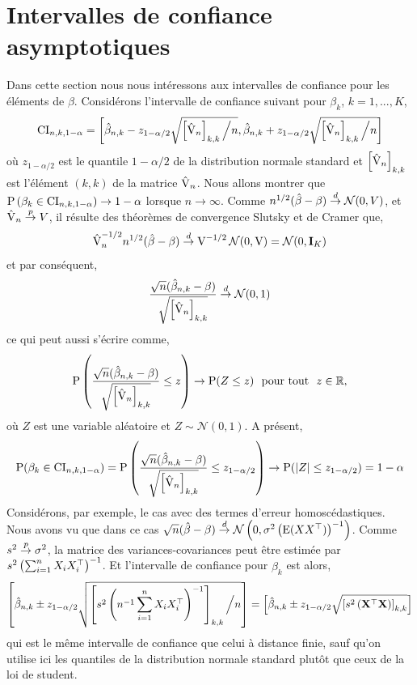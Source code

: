 \section{Intervalles de confiance asymptotiques}
Dans cette section nous nous intéressons aux intervalles de confiance pour les éléments de $\beta$. Considérons l'intervalle de confiance suivant pour $\beta_k$, $k=1,...,K$,
\begin{align*}
\mathrm{CI}_{n, k, 1-\alpha} = \left[\hat{\beta}_{n, k} - z_{1-\alpha/2}\sqrt{\left[\hat{\operatorname{V}}_n\right]_{k,k} \Big{/} n}, 
\hat{\beta}_{n, k} + z_{1-\alpha/2}\sqrt{\left[\hat{\operatorname{V}}_n\right]_{k,k} \Big{/} n}\right]
\end{align*}
où $ z_{1-\alpha/2}$ est le quantile $1-\alpha/2$ de la distribution normale standard et $\left[\hat{\operatorname{V}}_n\right]_{k,k} $ est l'élément $(k, k)$ de la matrice $\hat{\operatorname{V}}_n$. Nous allons montrer que $\operatorname{P}\left(\beta_k \in \mathrm{CI}_{n, k, 1-\alpha} \right) \rightarrow 1 - \alpha$ lorsque $n\rightarrow \infty$. Comme $n^{1/2}(\hat{\beta}- \beta) \overset{d}{\rightarrow} \mathcal{N}(0, V)$, et $\hat{\operatorname{V}}_n \overset{p}{\rightarrow} V$, 
il résulte des théorèmes de convergence Slutsky et de Cramer que,
\begin{align*}
\hat{\operatorname{V}}_n^{-1/2} n^{1/2}(\hat{\beta}- \beta) \overset{d}{\rightarrow} \operatorname{V}^{-1/2}\mathcal{N}(0, \operatorname{V}) = \mathcal{N}(0, \mathbf{I}_K)
\end{align*}
et par conséquent,
\begin{align*}
\frac{\sqrt{n}(\hat{\beta}_{n, k} - \beta)}{\sqrt{\left[\hat{\operatorname{V}}_n\right]_{k,k} }} \overset{d}{\rightarrow} \mathcal{N}(0, 1)
\end{align*}
ce qui peut aussi s'écrire comme,
\begin{align*}
\operatorname{P}\left(\frac{\sqrt{n}(\hat{\beta}_{n,k} - \beta)}{\sqrt{\left[\hat{\operatorname{V}}_n\right]_{k,k} }} \leq z \right) \rightarrow \operatorname{P}(Z\leq z) \ \ \textrm{pour tout} \ \ z \in \mathbb{R},
\end{align*}
où $Z$ est une variable aléatoire et $Z \sim \mathcal{N}(0, 1)$. A présent,
\begin{align*}
\operatorname{P}(\beta_k \in \mathrm{CI}_{n, k, 1-\alpha} ) = \operatorname{P}\left(\frac{\sqrt{n}(\hat{\beta}_{n,k} - \beta)}{\sqrt{\left[\hat{\operatorname{V}}_n\right]_{k,k} }} \leq z_{1-\alpha/2} \right) \rightarrow \operatorname{P}(\left\vert {Z} \right\vert \leq z_{1-\alpha/2}  ) = 1 - \alpha
\end{align*}
Considérons, par exemple, le cas avec des termes d'erreur homoscédastiques.  Nous avons vu que dans ce cas $\sqrt{n}(\hat{\beta}- \beta) \overset{d}{\rightarrow} \mathcal{N}\left(0, \sigma^2\left(\operatorname{E}(XX^\top)\right)^{-1}\right)$. Comme $s^2 \overset{p}{\rightarrow} \sigma^2$, la matrice des variances-covariances peut être estimée par $s^2\left(\sum_{i=1}^n X_iX_i^\top\right)^{-1}$. Et l'intervalle de confiance pour $\beta_k$ est alors,
\begin{align*}
\left[\hat{\beta}_{n, k} \pm  z_{1 -  \alpha/2} \sqrt{ \left[s^2\left(n^{-1}\sum_{i=1}^n X_iX_i^\top\right)^{-1} \right]_{k,k} \Big{/} n}\right] = \left[\hat{\beta}_{n, k}  \pm z_{1-\alpha/2} \sqrt{\left[s^2\left(\mathbf{X}^\top\mathbf{X}\right)\right]_{k,k}}\right] 
\end{align*}
qui est le même intervalle de confiance que celui à distance finie, sauf qu'on utilise ici les quantiles de la distribution normale standard plutôt que ceux de la loi de student.

